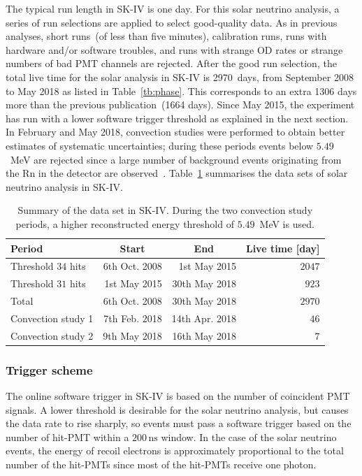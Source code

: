 \documentclass[aps,prd,reprint,superscriptaddress,floatfix,altaffilletter,nofootinbib]{revtex4-2}
\begin{document}
The typical run length in SK-IV is one day. 
For this solar neutrino analysis, a series of run selections are applied to select good-quality data.
As in previous analyses, short runs~(of less than five minutes), calibration runs, runs with hardware and/or software troubles, and 
runs with strange OD rates or strange numbers of bad PMT channels are rejected.
After the good run selection, the total live time for the solar analysis in SK-IV is 2970~days, from September 2008 to May 2018 as listed in Table~\ref{tb:phase}. 
This corresponds to an extra 1306 days more than the previous publication~(1664 days). 
Since May 2015, the experiment has run with a lower software trigger threshold as explained in the next section. In February and May 2018, convection studies were performed to obtain better estimates of systematic uncertainties; during these periods events below $5.49$~MeV are rejected since a large number of background events originating 
from the Rn in the detector are observed~\cite{nakano2023}.
Table~\ref{tb:dataset} summarises the data sets of solar neutrino analysis in SK-IV.
\begin{table}[htp]
\begin{center}
\caption{Summary of the data set in SK-IV. During the two convection study periods, a higher reconstructed energy threshold of $5.49$~MeV is used.} 
\label{tb:dataset}
\begin{tabular}{l@{\quad}r@{\quad}rr}
\hline
\hline
Period &\multicolumn{1}{c}{Start} & \multicolumn{1}{c}{End} & Live time [day] \\ \hline
Threshold $34$ hits & 6th Oct. 2008 & 1st May 2015 & $2047$ \\
Threshold $31$ hits & 1st May 2015 & 30th May 2018 & $923$ \\
Total  & 6th Oct. 2008 & 30th May 2018 & $2970$  \\
\hline
Convection study 1 & 7th Feb. 2018 & 14th Apr. 2018 & $46$  \\
Convection study 2 & 9th May  2018 & 16th May  2018 &  $7$  \\
\hline
\hline
\end{tabular}
\end{center}
\end{table}


\subsubsection{Trigger scheme}

The online software trigger in SK-IV is based on the number of coincident PMT signals. 
A lower threshold is desirable for the solar neutrino analysis, but causes the data rate to rise sharply, so events must pass a software trigger based on the number of hit-PMT within a $200\,\textrm{ns}$ window.
In the case of the solar neutrino events, the energy of recoil electrons is approximately proportional to the total number of the hit-PMTs
since most of the hit-PMTs receive one photon. 
\end{document}
